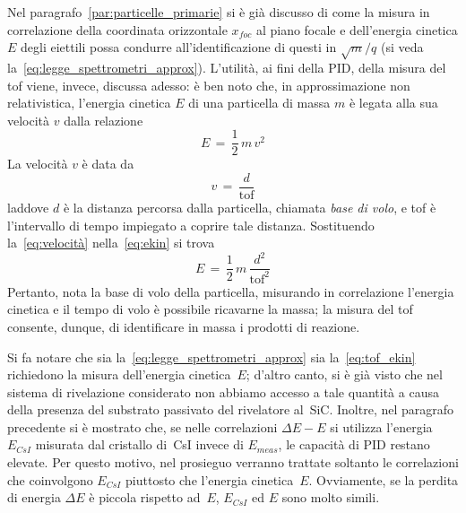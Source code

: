 Nel paragrafo~\ref{par:particelle_primarie} si è già discusso di come la misura in correlazione della coordinata orizzontale $x_{foc}$ al piano focale e dell'energia cinetica $E$ degli eiettili possa condurre all'identificazione di questi in $\sqrt{m}/q$ (si veda la~\ref{eq:legge_spettrometri_approx}).
L'utilità, ai fini della PID, della misura del tof viene, invece, discussa adesso: è ben noto che, in approssimazione non relativistica, l'energia cinetica $E$ di una particella di massa $m$ è legata alla sua velocità $v$ dalla relazione
\begin{equation} \label{eq:ekin}
	E \, = \, \frac{1}{2} \, m \, v^2
\end{equation}
La velocità $v$ è data da
\begin{equation} \label{eq:velocità}
v \, = \, \frac{d}{\mbox{tof}}
\end{equation}
laddove $d$ è la distanza percorsa dalla particella, chiamata \emph{base di volo}, e tof è l'intervallo di tempo impiegato a coprire tale distanza.
Sostituendo la~\ref{eq:velocità} nella~\ref{eq:ekin} si trova
\begin{equation} \label{eq:tof_ekin}
E \, = \, \frac{1}{2} \, m \, \frac{d^2}{\mbox{tof}^2}
\end{equation}
Pertanto, nota la base di volo della particella, misurando in correlazione l'energia cinetica e il tempo di volo è possibile ricavarne la massa; la misura del tof consente, dunque, di identificare in massa i prodotti di reazione.

Si fa notare che sia la~\ref{eq:legge_spettrometri_approx} sia la~\ref{eq:tof_ekin} richiedono la misura dell'energia cinetica~$E$; d'altro canto,  si è già visto che nel sistema di rivelazione considerato non abbiamo accesso a tale quantità a causa della presenza del substrato passivato del rivelatore al~SiC.
Inoltre, nel paragrafo precedente si è mostrato che, se nelle correlazioni $\Delta E - E$ si utilizza l'energia $E_{CsI}$ misurata dal cristallo di~CsI invece di $E_{meas}$, le capacità di PID restano elevate.
Per questo motivo, nel prosieguo verranno trattate soltanto le correlazioni che coinvolgono $E_{CsI}$ piuttosto che l'energia cinetica~$E$.
Ovviamente, se la perdita di energia $\Delta E$ è piccola rispetto ad~$E$, $E_{CsI}$ ed $E$ sono molto simili.


